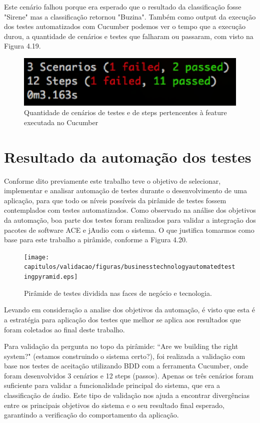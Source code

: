 Este cenário falhou porque era esperado que o resultado da classificação fosse "Sirene" mas a classificação retornou "Buzina". Também como output da execução dos testes automatizados com Cucumber podemos ver o tempo que a execução durou, a quantidade de cenários e testes que falharam ou passaram, com visto na Figura 4.19.

\begin{figure}[H]
	\centering
	\captionsetup{justification=centering,margin=2cm}
	\includegraphics[scale=0.65]{capitulos/validacao/figuras/quantidadeDeErrosQpassaramOUn.eps}
	\caption{Quantidade de cenários de testes e de steps pertencentes à feature executada no Cucumber}
	\label{fig:result-engajamento}
\end{figure}

\section{Resultado da automação dos testes}
Conforme dito previamente este trabalho teve o objetivo de selecionar, implementar e analisar automação de testes durante o desenvolvimento de uma aplicação, para que todo os níveis possíveis da pirâmide de testes \cite{James2011} fossem contemplados com testes automatizados. Como observado na análise dos objetivos da automação, boa parte dos testes foram realizados para validar a integração dos pacotes de software ACE e jAudio com o sistema. O que justifica tomarmos como base para este trabalho a pirâmide, conforme a Figura 4.20.

\begin{figure}[H]
	\centering
	\captionsetup{justification=centering,margin=2cm}
	\texttt{[image: capitulos/validacao/figuras/businesstechnologyautomatedtestingpyramid.eps]}
	\caption{Pirâmide de testes dividida nas faces de negócio e tecnologia.}
	\label{fig:result-engajamento}
\end{figure}

Levando em consideração a analise dos objetivos da automação, é visto que esta é a estratégia para aplicação dos testes que melhor se aplica aos resultados que foram coletados ao final deste trabalho.

Para validação da pergunta no topo da pirâmide: ``Are we building the right system?" (estamos construindo o sistema certo?), foi realizada a validação com base nos testes de aceitação utilizando BDD com a ferramenta Cucumber,  onde foram desenvolvidos 3 cenários e 12 steps (passos). Apenas os três cenários foram suficiente para validar a funcionalidade principal do sistema, que era a classificação de áudio. Este tipo de validação nos ajuda a encontrar divergências entre os principais objetivos do sistema e o seu resultado final esperado, garantindo a verificação do comportamento da aplicação. 

